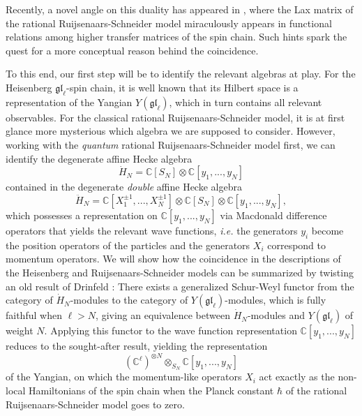\documentclass[11pt]{report}
\theoremstyle{definition}
\theoremstyle{remark}
\theoremstyle{remark}
\newcommand{\C}{\mathbb{C}}
\begin{document}
Recently, a novel angle on this duality has appeared in \cite{book:arutyunov:betheAnsatz}, where the Lax matrix of the rational Ruijsenaars-Schneider model miraculously appears in functional relations among higher transfer matrices of the spin chain. Such hints spark the quest for a more conceptual reason behind the coincidence.

To this end, our first step will be to identify the relevant algebras at play. For the Heisenberg $\mathfrak{gl}_\ell$-spin chain, it is well known that its Hilbert space is a representation of the Yangian $Y(\mathfrak{gl}_\ell)$, which in turn contains all relevant observables. For the classical rational Ruijsenaars-Schneider model, it is at first glance more mysterious which algebra we are supposed to consider. However, working with the \emph{quantum} rational Ruijsenaars-Schneider model first, we can identify the degenerate affine Hecke algebra
\begin{equation*}
\dot H_N = \C[S_N] \otimes \C[y_1,...,y_N]
\end{equation*}
contained in the degenerate \emph{double} affine Hecke algebra
\begin{equation*}
\ddot H_N = \C[X_1^{\pm 1},...,X_N^{\pm 1}] \otimes \C[S_N] \otimes \C[y_1,...,y_N],
\end{equation*}
which possesses a representation on $\C[y_1,...,y_N]$ via Macdonald difference operators that yields the relevant wave functions, \emph{i.e.} the generators $y_i$ become the position operators of the particles and the generators $X_i$ correspond to momentum operators. We will show how the coincidence in the descriptions of the Heisenberg and Ruijsenaars-Schneider models can be summarized by twisting an old result of Drinfeld \cite{article:drinfeld:1986}: There exists a generalized Schur-Weyl functor from the category of $\dot H_N$-modules to the category of $Y(\mathfrak{gl}_\ell)$-modules, which is fully faithful when $\ell > N$, giving an equivalence between $\dot H_N$-modules and $Y(\mathfrak{gl}_\ell)$ of weight $N$. Applying this functor to the wave function representation $\C[y_1,...,y_N]$ reduces to the sought-after result, yielding the representation
\begin{equation*}
(\C^\ell)^{\otimes N} \otimes_{S_N} \C[y_1,...,y_N]
\end{equation*}
of the Yangian, on which the momentum-like operators $X_i$ act exactly as the non-local Hamiltonians of the spin chain when the Planck constant $\hbar$ of the rational Ruijsenaars-Schneider model goes to zero.
\end{document}
